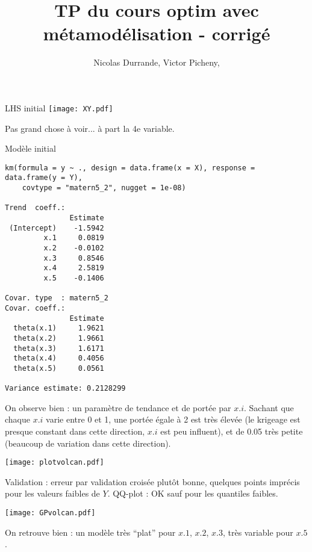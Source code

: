 \documentclass{beamer}
\title{TP du cours optim avec métamodélisation - corrigé}
\author{Nicolas Durrande, Victor Picheny,}
\date{\null}
\begin{document}
\begin{frame}
  \titlepage
\end{frame}
\begin{frame}[fragile]{LHS initial}
\texttt{[image: XY.pdf]} 

Pas grand chose à voir... à part la 4e variable.

\end{frame}
\begin{frame}[fragile]{Modèle initial}
 \begin{Verbatim}[fontsize=\tiny]
km(formula = y ~ ., design = data.frame(x = X), response = data.frame(y = Y), 
    covtype = "matern5_2", nugget = 1e-08)

Trend  coeff.:
               Estimate
 (Intercept)    -1.5942
         x.1     0.0819
         x.2    -0.0102
         x.3     0.8546
         x.4     2.5819
         x.5    -0.1406

Covar. type  : matern5_2 
Covar. coeff.:
               Estimate
  theta(x.1)     1.9621
  theta(x.2)     1.9661
  theta(x.3)     1.6171
  theta(x.4)     0.4056
  theta(x.5)     0.0561

Variance estimate: 0.2128299
\end{Verbatim}
On observe bien : un paramètre de tendance et de portée par $x.i$. Sachant que chaque $x.i$ varie entre 0 et 1, une portée égale à 2 est très élevée (le krigeage est presque constant dans cette direction, $x.i$ est peu influent), 
et de 0.05 très petite (beaucoup de variation dans cette direction).
\end{frame}
\begin{frame}[fragile]
\texttt{[image: plotvolcan.pdf]} 

Validation : erreur par validation croisée plutôt bonne, quelques points imprécis pour les valeurs faibles de $Y$. QQ-plot : OK sauf pour les quantiles faibles.

\end{frame}
\begin{frame}[fragile]
\texttt{[image: GPvolcan.pdf]} 

On retrouve bien : un modèle très ``plat'' pour $x.1$, $x.2$, $x.3$, très variable pour $x.5$.
\end{frame}
\end{document}
